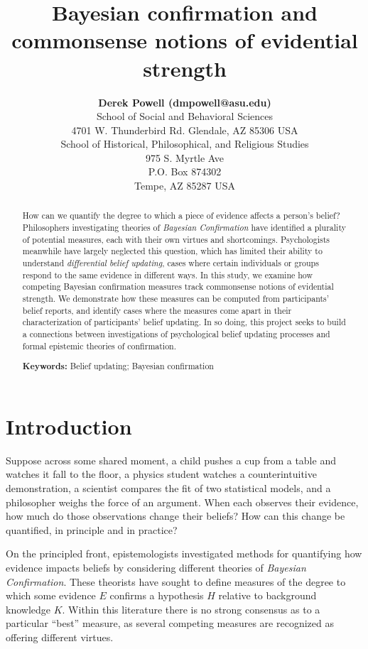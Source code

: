 \documentclass[10pt, letterpaper]{article}
\title{Bayesian confirmation and commonsense notions of evidential
strength}
\author{{\large \bf Derek Powell (dmpowell@asu.edu)} \\ School of Social and Behavioral Sciences \\ 4701 W. Thunderbird Rd. Glendale, AZ 85306 USA \AND {\large \bf Shyam Nair (gsnair@asu.edu)} \\ School of Historical, Philosophical, and Religious Studies \\ 975 S. Myrtle Ave \\ P.O. Box 874302 \\ Tempe, AZ 85287 USA}
\begin{document}
\maketitle

\begin{abstract}
How can we quantify the degree to which a piece of evidence affects a
person's belief? Philosophers investigating theories of \emph{Bayesian
Confirmation} have identified a plurality of potential measures, each
with their own virtues and shortcomings. Psychologists meanwhile have
largely neglected this question, which has limited their ability to
understand \emph{differential belief updating}, cases where certain
individuals or groups respond to the same evidence in different ways. In
this study, we examine how competing Bayesian confirmation measures
track commonsense notions of evidential strength. We demonstrate how
these measures can be computed from participants' belief reports, and
identify cases where the measures come apart in their characterization
of participants' belief updating. In so doing, this project seeks to
build a connections between investigations of psychological belief
updating processes and formal epistemic theories of confirmation.

\textbf{Keywords:}
Belief updating; Bayesian confirmation
\end{abstract}

\hypertarget{introduction}{%
\section{Introduction}\label{introduction}}

Suppose across some shared moment, a child pushes a cup from a table and
watches it fall to the floor, a physics student watches a
counterintuitive demonstration, a scientist compares the fit of two
statistical models, and a philosopher weighs the force of an argument.
When each observes their evidence, how much do those observations change
their beliefs? How can this change be quantified, in principle and in
practice?

On the principled front, epistemologists investigated methods for
quantifying how evidence impacts beliefs by considering different
theories of \emph{Bayesian Confirmation}. These theorists have sought to
define measures of the degree to which some evidence \(E\) confirms a
hypothesis \(H\) relative to background knowledge \(K\). Within this
literature there is no strong consensus as to a particular ``best''
measure, as several competing measures are recognized as offering
different virtues.
\end{document}
